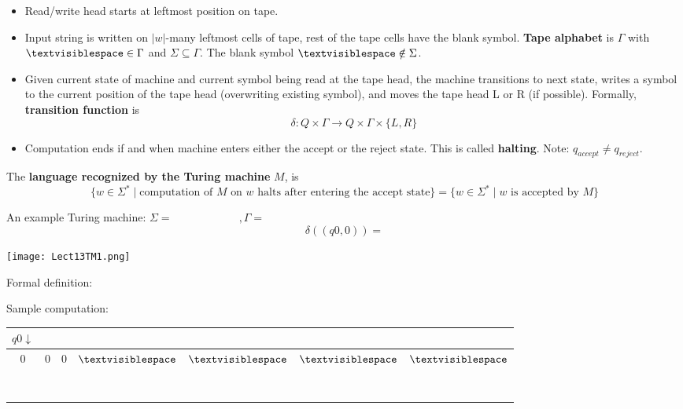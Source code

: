 \documentclass[12pt, oneside]{article}
\begin{document}
\begin{itemize}
\setlength{\itemsep}{0pt}
\item Read/write head starts at leftmost position on tape. 
\item Input string is written on $|w|$-many leftmost cells of tape, 
rest of  the tape cells have  the blank symbol. {\bf Tape alphabet} 
is $\Gamma$ with $\textvisiblespace\in \Gamma$ and $\Sigma \subseteq \Gamma$.
The blank symbol $\textvisiblespace \notin \Sigma$.
\item Given current state of machine and current symbol being read at the tape head, 
the machine transitions to next state, writes a symbol to the current position  of the 
tape  head (overwriting existing symbol), and moves the tape head L or R (if possible). 
Formally, {\bf transition function}  is 
\[
  \delta: Q\times \Gamma \to Q \times \Gamma \times \{L, R\}
\]
\item Computation ends if and when machine enters either the accept or the reject state.
This is called {\bf halting}.
Note: $q_{accept} \neq q_{reject}$.
\end{itemize}

The {\bf language recognized by the  Turing machine} $M$,  is  
\[
  \{ w \in \Sigma^* \mid \textrm{computation of $M$ on $w$ halts after entering the accept state}\} = \{ w \in \Sigma^* \mid w \textrm{ is accepted by } M\}
\]

\newpage
An example Turing machine: $\Sigma = \phantom{\hspace{1in}}, \Gamma = \phantom{\hspace{1in}} $
\[
  \delta ( ( q0, 0)  ) =  
\]

\texttt{[image: Lect13TM1.png]}

Formal definition: 


Sample computation: 

\begin{tabular}{|c|c|c|c|c|c|c|}
\hline
\multicolumn{1}{|c}{$q0\downarrow$} &  \multicolumn{6}{c|}{\phantom{A}}\\
\hline
$0$ & $0$  & $0$ & $\textvisiblespace $& $\textvisiblespace $& $\textvisiblespace $&  $\textvisiblespace $\\
\hline
\multicolumn{7}{|c|}{\phantom{A}}\\
\hline
\phantom{AA} & \phantom{AA}& \phantom{AA}& \phantom{AA}& \phantom{AA}& \phantom{AA}& \phantom{AA} \\
\hline
\multicolumn{7}{|c|}{\phantom{A}}\\
\hline
\phantom{AA} & \phantom{AA}& \phantom{AA}& \phantom{AA}& \phantom{AA}& \phantom{AA}& \phantom{AA} \\
\hline
\multicolumn{7}{|c|}{\phantom{A}}\\
\hline
\phantom{AA} & \phantom{AA}& \phantom{AA}& \phantom{AA}& \phantom{AA}& \phantom{AA}& \phantom{AA} \\
\hline
\multicolumn{7}{|c|}{\phantom{A}}\\
\hline
\phantom{AA} & \phantom{AA}& \phantom{AA}& \phantom{AA}& \phantom{AA}& \phantom{AA}& \phantom{AA} \\
\hline
\end{tabular}
\end{document}

